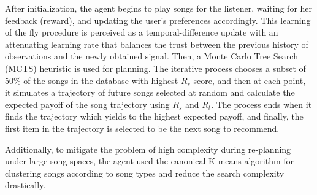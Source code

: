After initialization, the agent begins to play songs for the listener, waiting for her feedback (reward), and updating the user's preferences accordingly. This learning of the fly procedure is perceived as a temporal-difference update with an attenuating learning rate that balances the trust between the previous history of observations and the newly obtained signal.
%
Then, a Monte Carlo Tree Search (MCTS) heuristic \cite{chaslot2010monte} is used for planning. The iterative process chooses a subset of 50\% of the songs in the database with highest $R_s$ score, and then at each point, it simulates a trajectory of future songs selected at random and calculate the expected payoff of the song trajectory using $R_s$ and $R_t$. The process ends when it finds the trajectory which yields to the highest expected payoff, and finally, the first item in the trajectory is selected to be the next song to recommend.

Additionally, to mitigate the problem of high complexity during re-planning under large song spaces, the agent used the canonical K-means algorithm for clustering songs according to song types and reduce the search complexity drastically.

